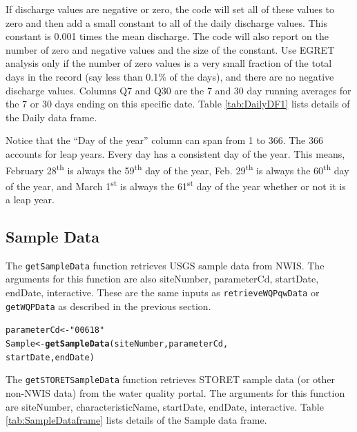 \documentclass[a4paper,11pt]{article}\usepackage[]{graphicx}\usepackage[]{color}
\makeatletter
\newcommand{\hlstr}[1]{\textcolor[rgb]{0.192,0.494,0.8}{#1}}%
\newcommand{\hlstd}[1]{\textcolor[rgb]{0.345,0.345,0.345}{#1}}%
\newcommand{\hlkwb}[1]{\textcolor[rgb]{0.69,0.353,0.396}{#1}}%
\newcommand{\hlkwd}[1]{\textcolor[rgb]{0.737,0.353,0.396}{\textbf{#1}}}%
\newenvironment{kframe}{%
 \def\at@end@of@kframe{}%
 \ifinner\ifhmode%
  \def\at@end@of@kframe{\end{minipage}}%
  \begin{minipage}{\columnwidth}%
 \fi\fi%
 \def\FrameCommand##1{\hskip\@totalleftmargin \hskip-\fboxsep
 \colorbox{shadecolor}{##1}\hskip-\fboxsep
     \hskip-\linewidth \hskip-\@totalleftmargin \hskip\columnwidth}%
 \MakeFramed {\advance\hsize-\width
   \@totalleftmargin\z@ \linewidth\hsize
   \@setminipage}}%
 {\par\unskip\endMakeFramed%
 \at@end@of@kframe}
\newenvironment{knitrout}{}{} %
\makeatother
\begin{document}
If discharge values are negative or zero, the code will set all of these values to zero and then add a small constant to all of the daily discharge values.  This constant is 0.001 times the mean discharge.  The code will also report on the number of zero and negative values and the size of the constant.  Use EGRET analysis only if the number of zero values is a very small fraction of the total days in the record (say less than 0.1\% of the days), and there are no negative discharge values.  Columns Q7 and Q30 are the 7 and 30 day running averages for the 7 or 30 days ending on this specific date. Table \ref{tab:DailyDF1} lists details of the Daily data frame.

Notice that the \enquote{Day of the year} column can span from 1 to 366. The 366 accounts for leap years. Every day has a consistent day of the year. This means, February 28\textsuperscript{th} is always the 59\textsuperscript{th} day of the year, Feb. 29\textsuperscript{th} is always the 60\textsuperscript{th} day of the year, and March 1\textsuperscript{st} is always the 61\textsuperscript{st} day of the year whether or not it is a leap year.

\FloatBarrier

\subsection{Sample Data}
\label{Samplesubsection}
The \texttt{getSampleData} function retrieves USGS sample data from NWIS. The arguments for this function are also siteNumber, parameterCd, startDate, endDate, interactive. These are the same inputs as \texttt{retrieveWQPqwData} or \texttt{getWQPData} as described in the previous section.

\begin{knitrout}
\color{fgcolor}\begin{kframe}
\begin{alltt}
\hlstd{parameterCd} \hlkwb{<-} \hlstr{"00618"}
\hlstd{Sample} \hlkwb{<-}\hlkwd{getSampleData}\hlstd{(siteNumber,parameterCd,}
      \hlstd{startDate, endDate)}
\end{alltt}
\end{kframe}
\end{knitrout}

The \texttt{getSTORETSampleData} function retrieves STORET sample data (or other non-NWIS data) from the water quality portal. The arguments for this function are siteNumber, characteristicName, startDate, endDate, interactive. Table \ref{tab:SampleDataframe} lists details of the Sample data frame. 
\end{document}
